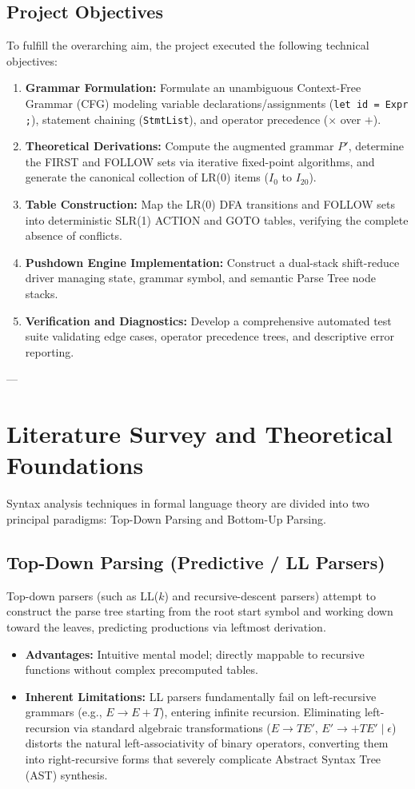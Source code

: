 \documentclass[11pt,a4paper]{article}
\begin{document}
\subsection{Project Objectives}
To fulfill the overarching aim, the project executed the following technical objectives:
\begin{enumerate}
    \item \textbf{Grammar Formulation:} Formulate an unambiguous Context-Free Grammar (CFG) modeling variable declarations/assignments (\texttt{let id = Expr ;}), statement chaining (\texttt{StmtList}), and operator precedence ($\times$ over $+$).
    \item \textbf{Theoretical Derivations:} Compute the augmented grammar $P'$, determine the FIRST and FOLLOW sets via iterative fixed-point algorithms, and generate the canonical collection of LR(0) items ($I_0$ to $I_{20}$).
    \item \textbf{Table Construction:} Map the LR(0) DFA transitions and FOLLOW sets into deterministic SLR(1) ACTION and GOTO tables, verifying the complete absence of conflicts.
    \item \textbf{Pushdown Engine Implementation:} Construct a dual-stack shift-reduce driver managing state, grammar symbol, and semantic Parse Tree node stacks.
    \item \textbf{Verification and Diagnostics:} Develop a comprehensive automated test suite validating edge cases, operator precedence trees, and descriptive error reporting.
\end{enumerate}

---

\section{Literature Survey and Theoretical Foundations}

Syntax analysis techniques in formal language theory are divided into two principal paradigms: Top-Down Parsing and Bottom-Up Parsing.

\subsection{Top-Down Parsing (Predictive / LL Parsers)}
Top-down parsers (such as LL($k$) and recursive-descent parsers) attempt to construct the parse tree starting from the root start symbol and working down toward the leaves, predicting productions via leftmost derivation.
\begin{itemize}
    \item \textbf{Advantages:} Intuitive mental model; directly mappable to recursive functions without complex precomputed tables.
    \item \textbf{Inherent Limitations:} LL parsers fundamentally fail on left-recursive grammars (e.g., $E \to E + T$), entering infinite recursion. Eliminating left-recursion via standard algebraic transformations ($E \to T E'$, $E' \to + T E' \mid \epsilon$) distorts the natural left-associativity of binary operators, converting them into right-recursive forms that severely complicate Abstract Syntax Tree (AST) synthesis.
\end{itemize}
\end{document}
